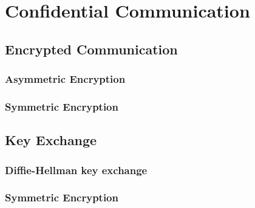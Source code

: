 \section{Confidential Communication}
\subsection{Encrypted Communication}
\subsubsection{Asymmetric Encryption}
\subsubsection{Symmetric Encryption}

\subsection{Key Exchange}
\subsubsection{Diffie-Hellman key exchange}
\subsubsection{Symmetric Encryption}






